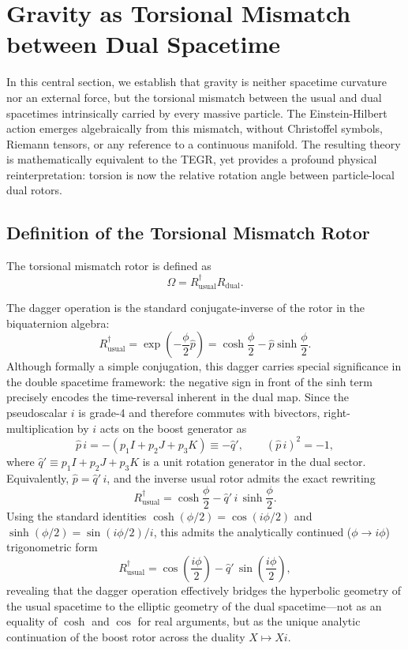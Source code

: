 \documentclass[dvipdfmx,a4paper]{article}
\begin{document}
\section{Gravity as Torsional Mismatch between Dual Spacetime}
\label{sec:gravity}

In this central section, we establish that gravity is neither spacetime curvature nor an external force, but the torsional mismatch between the usual and dual spacetimes intrinsically carried by every massive particle. The Einstein-Hilbert action emerges algebraically from this mismatch, without Christoffel symbols, Riemann tensors, or any reference to a continuous manifold. The resulting theory is mathematically equivalent to the TEGR, yet provides a profound physical reinterpretation: torsion is now the relative rotation angle between particle-local dual rotors.

\subsection{Definition of the Torsional Mismatch Rotor}

The torsional mismatch rotor is defined as
\[
\Omega = R_\text{usual}^\dagger R_\text{dual}.
\]

The dagger operation is the standard conjugate-inverse of the rotor in the biquaternion algebra:
\[
R_\text{usual}^\dagger = \exp\!\left( -\frac{\phi}{2} \hat{p} \right)
= \cosh\frac{\phi}{2} - \hat{p} \sinh\frac{\phi}{2}.
\]
Although formally a simple conjugation, this dagger carries special significance in the double spacetime framework: the negative sign in front of the sinh term precisely encodes the time-reversal inherent in the dual map. Since the pseudoscalar $i$ is grade-4 and therefore commutes with bivectors, right-multiplication by $i$ acts on the boost generator as
\[
\hat{p}\, i = - (p_1 I + p_2 J + p_3 K) \equiv -\hat{q}',
\qquad (\hat{p}\, i)^2 = -1,
\]
where $\hat{q}' \equiv p_1 I + p_2 J + p_3 K$ is a unit rotation generator in the dual sector. Equivalently, $\hat{p} = \hat{q}'\, i$, and the inverse usual rotor admits the exact rewriting
\[
R_\text{usual}^\dagger = \cosh\frac{\phi}{2} - \hat{q}'\, i\, \sinh\frac{\phi}{2}.
\]
Using the standard identities $\cosh(\phi/2) = \cos(i\phi/2)$ and $\sinh(\phi/2) = \sin(i\phi/2)/i$, this admits the analytically continued ($\phi \to i\phi$) trigonometric form
\[
R_\text{usual}^\dagger = \cos\!\left(\frac{i\phi}{2}\right) - \hat{q}'\, \sin\!\left(\frac{i\phi}{2}\right),
\]
revealing that the dagger operation effectively bridges the hyperbolic geometry of the usual spacetime to the elliptic geometry of the dual spacetime---not as an equality of $\cosh$ and $\cos$ for real arguments, but as the unique analytic continuation of the boost rotor across the duality $X \mapsto X i$.
\end{document}
